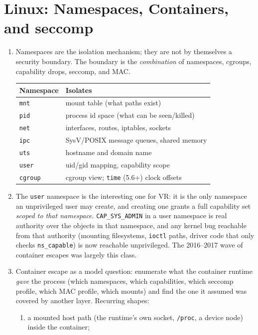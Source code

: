 \documentclass[12pt]{Training}
\begin{document}
\section*{Linux: Namespaces, Containers, and seccomp}
\begin{enumerate}
    \item Namespaces are the isolation mechanism; they are not by themselves a security boundary. The boundary is the \emph{combination} of namespaces, cgroups, capability drops, seccomp, and MAC.
    \begin{center}
    \footnotesize
    \begin{tabular}{@{}ll@{}}
    \toprule
    \textbf{Namespace} & \textbf{Isolates} \\
    \midrule
    \lstinline|mnt| & mount table (what paths exist) \\
    \lstinline|pid| & process id space (what can be seen/killed) \\
    \lstinline|net| & interfaces, routes, iptables, sockets \\
    \lstinline|ipc| & SysV/POSIX message queues, shared memory \\
    \lstinline|uts| & hostname and domain name \\
    \lstinline|user| & uid/gid mapping, capability scope \\
    \lstinline|cgroup| & cgroup view; \lstinline|time| (5.6+) clock offsets \\
    \bottomrule
    \end{tabular}
    \end{center}
    \item The \lstinline{user} namespace is the interesting one for VR: it is the only namespace an unprivileged user may create, and creating one grants a full capability set \emph{scoped to that namespace}. \lstinline{CAP_SYS_ADMIN} in a user namespace is real authority over the objects in that namespace, and any kernel bug reachable from that authority (mounting filesystems, \lstinline{ioctl} paths, driver code that only checks \lstinline{ns_capable}) is now reachable unprivileged. The 2016--2017 wave of container escapes was largely this class.
    \item Container escape as a model question: enumerate what the container runtime \emph{gave} the process (which namespaces, which capabilities, which seccomp profile, which MAC profile, which mounts) and find the one it assumed was covered by another layer. Recurring shapes:
    \begin{enumerate}
        \item a mounted host path (the runtime's own socket, \lstinline{/proc}, a device node) inside the container;

\end{enumerate}
\end{enumerate}
\end{document}
